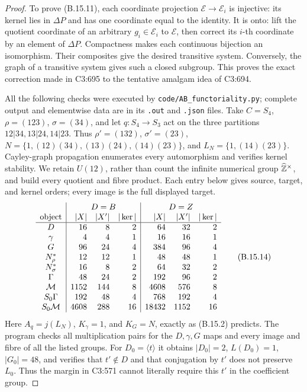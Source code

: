 \begin{proof}
To prove (B.15.11), each coordinate projection
\(\mathcal E\to\mathcal E_i\) is injective: its kernel lies
in \(\Delta P\) and has one coordinate equal to the identity.
It is onto: lift the quotient coordinate of an arbitrary
\(g_i\in\mathcal E_i\) to \(\mathcal E\), then correct its
\(i\)-th coordinate by an element of \(\Delta P\).
Compactness makes each continuous bijection an isomorphism.
Their composites give the desired transitive system. Conversely,
the graph of a transitive system gives such a closed subgroup.
This proves the exact correction made in C3:695 to the tentative
amalgam idea of C3:694.

All the following checks were executed by
\texttt{code/AB\_functoriality.py}; complete output and elementwise
data are in its \texttt{.out} and \texttt{.json} files. Take
\(C=S_4\), \(\rho=(123)\), \(\sigma=(34)\), and let
\(q:S_4\to S_3\) act on the three partitions
\(12|34,13|24,14|23\). Thus
\(\rho'=(132)\), \(\sigma'=(23)\),
\(N=\{1,(12)(34),(13)(24),(14)(23)\}\), and
\(L_N=\{1,(14)(23)\}\). Cayley-graph propagation enumerates
every automorphism and verifies kernel stability. We retain
\(U(12)\), rather than count the infinite numerical group
\(\widehat{\mathbb Z}^\times\), and build every quotient and
fibre product. Each entry below gives source, target, and kernel
orders; every image is the full displayed target.
\[
\begin{array}{c|rrr|rrr}
 &\multicolumn{3}{c|}{D=B}&\multicolumn{3}{c}{D=Z}\\
 \text{object}&|X|&|X'|&|\ker|&|X|&|X'|&|\ker|\\\hline
 D&16&8&2&64&32&2\\
 \gamma&4&4&1&16&16&1\\
 G&96&24&4&384&96&4\\
 N_\rho^*&12&12&1&48&48&1\\
 N_\sigma^*&16&8&2&64&32&2\\
 \Gamma&48&24&2&192&96&2\\
 \mathcal M&1152&144&8&4608&576&8\\
 S_0\Gamma&192&48&4&768&192&4\\
 S_0\mathcal M&4608&288&16&18432&1152&16
\end{array}
\tag{B.15.14}
\]
Here \(A_q=j(L_N)\), \(K_\gamma=1\), and \(K_G=N\), exactly
as (B.15.2) predicts. The program checks all multiplication pairs
for the \(D,\gamma,G\) maps and every image and fibre of all
the listed groups. For \(D_0=\langle t\rangle\) it obtains
\(|D_0|=2\), \(L(D_0)=1\), \(|G_0|=48\), and verifies that
\(t'\notin D\) and that conjugation by \(t'\) does not preserve
\(L_0\). Thus the margin in C3:571 cannot literally require
this \(t'\) in the coefficient group.


\end{proof}
